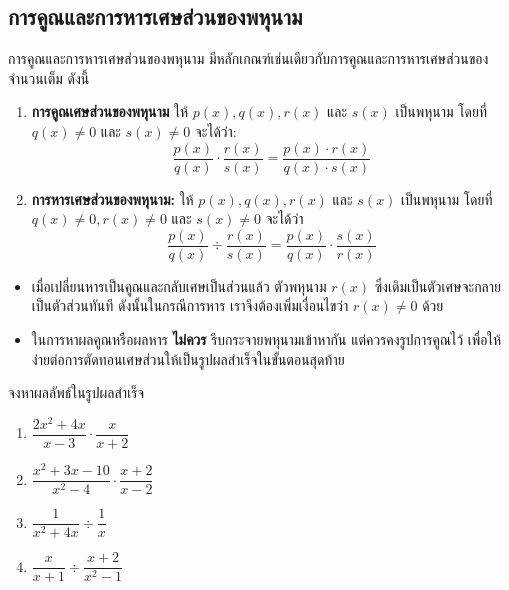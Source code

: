 \subsection*{การคูณและการหารเศษส่วนของพหุนาม}
การคูณและการหารเศษส่วนของพหุนาม มีหลักเกณฑ์เช่นเดียวกับการคูณและการหารเศษส่วนของจำนวนเต็ม ดังนี้
\begin{conceptbox}
	\begin{enumerate}[label=\arabic*), leftmargin=2.5em]
    \item \textbf{การคูณเศษส่วนของพหุนาม} 
    ให้ $p(x), q(x), r(x)$ และ $s(x)$ เป็นพหุนาม โดยที่ $q(x) \neq 0$ และ $s(x) \neq 0$ จะได้ว่า:
    \[ \dfrac{p(x)}{q(x)} \cdot \dfrac{r(x)}{s(x)} = \dfrac{p(x) \cdot r(x)}{q(x) \cdot s(x)} \]

    \item \textbf{การหารเศษส่วนของพหุนาม:} 
    ให้ $p(x), q(x), r(x)$ และ $s(x)$ เป็นพหุนาม โดยที่ $q(x) \neq 0, r(x) \neq 0$ และ $s(x) \neq 0$ จะได้ว่า
    \[ \dfrac{p(x)}{q(x)} \div \dfrac{r(x)}{s(x)} = \dfrac{p(x)}{q(x)} \cdot \dfrac{s(x)}{r(x)} \]
\end{enumerate}
\end{conceptbox}

\observation
\begin{itemize}
	\item  เมื่อเปลี่ยนหารเป็นคูณและกลับเศษเป็นส่วนแล้ว ตัวพหุนาม $r(x)$ ซึ่งเดิมเป็นตัวเศษจะกลายเป็นตัวส่วนทันที ดังนั้นในกรณีการหาร เราจึงต้องเพิ่มเงื่อนไขว่า $r(x) \neq 0$ ด้วย

 \item ในการหาผลคูณหรือผลหาร \textbf{ไม่ควร} รีบกระจายพหุนามเข้าหากัน แต่ควรคงรูปการคูณไว้ เพื่อให้ง่ายต่อการตัดทอนเศษส่วนให้เป็นรูปผลสำเร็จในขั้นตอนสุดท้าย
\end{itemize}

\newpage
\begin{examplebox}
จงหาผลลัพธ์ในรูปผลสำเร็จ
	\begin{enumerate}[label=\arabic*), leftmargin=2.5em]
		\item $\dfrac{2x^2+4x}{x-3} \cdot \dfrac{x}{x+2}$
		\item $\dfrac{x^2+3x-10}{x^2-4} \cdot \dfrac{x+2}{x-2}$
		\item $\dfrac{1}{x^2+4x} \div \dfrac{1}{x}$
		\item $\dfrac{x}{x+1} \div \dfrac{x+2}{x^2-1}$
	\end{enumerate}  
\end{examplebox}
\solution

    
\newpage
